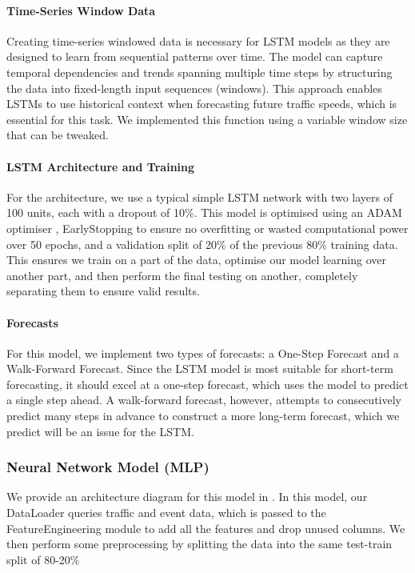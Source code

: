\paragraph{Time-Series Window Data}
Creating time-series windowed data is necessary for LSTM models as they are designed to learn from sequential patterns over time. The model can capture temporal dependencies and trends spanning multiple time steps by structuring the data into fixed-length input sequences (windows). This approach enables LSTMs to use historical context when forecasting future traffic speeds, which is essential for this task. We implemented this function using a variable window size that can be tweaked.

\paragraph{LSTM Architecture and Training}
For the architecture, we use a typical simple LSTM network with two layers of 100 units, each with a dropout of 10\%. This model is optimised using an ADAM optimiser \cite{kingma_adam_2017}, EarlyStopping to ensure no overfitting or wasted computational power over 50 epochs, and a validation split of 20\% of the previous 80\% training data. This ensures we train on a part of the data, optimise our model learning over another part, and then perform the final testing on another, completely separating them to ensure valid results.

\paragraph{Forecasts}
For this model, we implement two types of forecasts: a One-Step Forecast and a Walk-Forward Forecast. Since the LSTM model is most suitable for short-term forecasting, it should excel at a one-step forecast, which uses the model to predict a single step ahead. A walk-forward forecast, however, attempts to consecutively predict many steps in advance to construct a more long-term forecast, which we predict will be an issue for the LSTM.

\subsubsection{Neural Network Model (MLP)}
\label{link:mlp-design}
We provide an architecture diagram for this model in . In this model, our DataLoader queries traffic and event data, which is passed to the FeatureEngineering module to add all the features and drop unused columns. We then perform some preprocessing by splitting the data into the same test-train split of 80-20\% %

